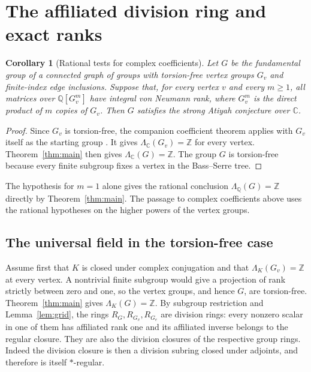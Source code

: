 \documentclass[11pt,a4paper,reqno]{amsart}
\numberwithin{equation}{section}
\newtheorem{corollary}[theorem]{Corollary}
\theoremstyle{remark}
\newcommand{\C}{\mathbb C}
\newcommand{\Q}{\mathbb Q}
\newcommand{\Z}{\mathbb Z}
\begin{document}
\section{The affiliated division ring and exact ranks}\label{sec:sac-structural}

\begin{corollary}[Rational tests for complex coefficients]\label{cor:coefficients}
Let \(G\) be the fundamental group of a connected graph of groups with torsion-free vertex groups \(G_v\) and finite-index edge inclusions. Suppose that, for every vertex \(v\) and every \(m\geq 1\), all matrices over \(\Q[G_v^m]\) have integral von Neumann rank, where \(G_v^m\) is the direct product of \(m\) copies of \(G_v\). Then \(G\) satisfies the strong Atiyah conjecture over \(\C\).
\end{corollary}

\begin{proof}
Since \(G_v\) is torsion-free, the companion coefficient theorem applies with \(G_v\) itself as the starting group \cite[Theorem~1.2]{Coeff}. It gives \(\Lambda_{\C}(G_v)=\Z\) for every vertex. Theorem~\ref{thm:main} then gives \(\Lambda_{\C}(G)=\Z\). The group \(G\) is torsion-free because every finite subgroup fixes a vertex in the Bass--Serre tree.
\end{proof}

The hypothesis for \(m=1\) alone gives the rational conclusion \(\Lambda_{\Q}(G)=\Z\) directly by Theorem~\ref{thm:main}. The passage to complex coefficients above uses the rational hypotheses on the higher powers of the vertex groups.

\subsection{The universal field in the torsion-free case}

Assume first that \(K\) is closed under complex conjugation and that \(\Lambda_K(G_v)=\Z\) at every vertex. A nontrivial finite subgroup would give a projection of rank strictly between zero and one, so the vertex groups, and hence \(G\), are torsion-free. Theorem~\ref{thm:main} gives \(\Lambda_K(G)=\Z\). By subgroup restriction and Lemma~\ref{lem:grid}, the rings \(R_G,R_{G_v},R_{G_e}\) are division rings: every nonzero scalar in one of them has affiliated rank one and its affiliated inverse belongs to the regular closure. They are also the division closures of the respective group rings. Indeed the division closure is then a division subring closed under adjoints, and therefore is itself \(*\)-regular.
\end{document}
